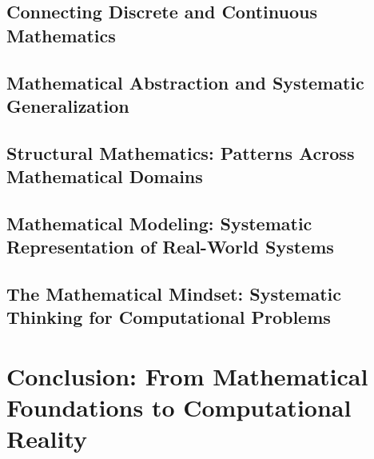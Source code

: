 \documentclass[12pt, oneside, openany]{book}
\begin{document}
\section{Connecting Discrete and Continuous Mathematics}

\section{Mathematical Abstraction and Systematic Generalization}

\section{Structural Mathematics: Patterns Across Mathematical Domains}

\section{Mathematical Modeling: Systematic Representation of Real-World Systems}

\section{The Mathematical Mindset: Systematic Thinking for Computational Problems}

\chapter*{Conclusion: From Mathematical Foundations to Computational Reality}
\end{document}
